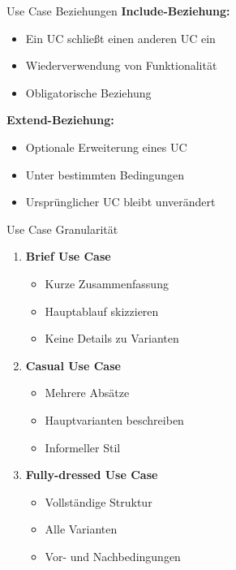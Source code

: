 \begin{concept}{Use Case Beziehungen}
\textbf{Include-Beziehung:}
\begin{itemize}
    \item Ein UC schließt einen anderen UC ein
    \item Wiederverwendung von Funktionalität
    \item Obligatorische Beziehung
\end{itemize}

\textbf{Extend-Beziehung:}
\begin{itemize}
    \item Optionale Erweiterung eines UC
    \item Unter bestimmten Bedingungen
    \item Ursprünglicher UC bleibt unverändert
\end{itemize}
\end{concept}

\begin{concept}{Use Case Granularität}
\begin{enumerate}
    \item \textbf{Brief Use Case}
    \begin{itemize}
        \item Kurze Zusammenfassung
        \item Hauptablauf skizzieren
        \item Keine Details zu Varianten
    \end{itemize}
    \item \textbf{Casual Use Case}
    \begin{itemize}
        \item Mehrere Absätze
        \item Hauptvarianten beschreiben
        \item Informeller Stil
    \end{itemize}
    \item \textbf{Fully-dressed Use Case}
    \begin{itemize}
        \item Vollständige Struktur
        \item Alle Varianten
        \item Vor- und Nachbedingungen
    \end{itemize}
\end{enumerate}
\end{concept}

